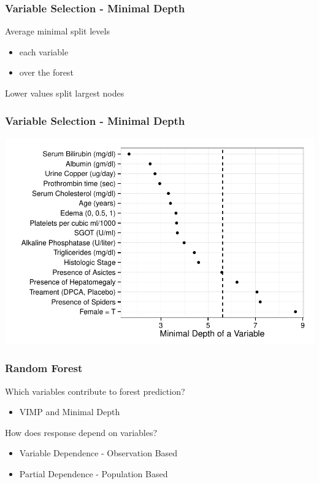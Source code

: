 \documentclass[xcolor=svgnames]{beamer}\usepackage[]{graphicx}\usepackage[]{color}
\newenvironment{knitrout}{}{} %
\begin{document}
\begin{frame}
\frametitle{Variable Selection - Minimal Depth}

Average minimal split levels
\begin{itemize}
\item  each variable
  \item over the forest
\end{itemize}

Lower values split largest nodes
\end{frame}
\begin{frame}
\frametitle{Variable Selection - Minimal Depth}
\begin{knitrout}\footnotesize
{}\color{fgcolor}

{\centering \includegraphics[width=.9\linewidth]{figures/mindepth-pbc-1} 

}



\end{knitrout}
\end{frame}
\begin{frame}
\frametitle{Random Forest}
Which variables contribute to forest prediction?
\begin{itemize}
\item  VIMP and Minimal Depth
\end{itemize}

How does response depend on variables?
\begin{itemize}
\item  Variable Dependence - Observation Based
\item  Partial Dependence - Population Based
\end{itemize}
\end{frame}
\end{document}

